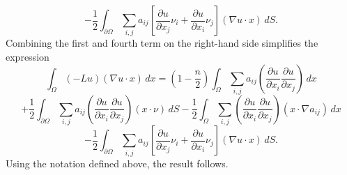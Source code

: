 $$- \frac{1}{2} \int_{\partial\Omega}
\sum_{i,j} a_{ij} \left[
\frac{\partial u}{\partial x_j} \nu_{i} +
\frac{\partial u}{\partial x_i} \nu_{j}
\right] (\nabla u\cdot x) \, dS.
$$
Combining the first and fourth term on the right-hand side
simplifies the expression
$$\int_{\Omega}(-Lu)(\nabla u\cdot x)\, dx
=
(1-\frac{n}{2}) \int_{\Omega}
\sum_{i,j} a_{ij} \left(
\frac{\partial u}{\partial x_i}
\frac{\partial u}{\partial x_j}
\right) \, dx
$$
$$
+
\frac{1}{2} \int_{\partial\Omega}
\sum_{i,j} a_{ij} \left(
\frac{\partial u}{\partial x_i}
\frac{\partial u}{\partial x_j}
\right) (x\cdot \nu ) \, dS
-
\frac{1}{2} \int_{\Omega}
\sum_{i,j} \left(
\frac{\partial u}{\partial x_i}
\frac{\partial u}{\partial x_j}
\right) (x\cdot  \nabla a_{ij}) \, dx
$$
$$
-
\frac{1}{2} \int_{\partial\Omega}
\sum_{i,j} a_{ij} \left[
\frac{\partial u}{\partial x_j} \nu_{i} +
\frac{\partial u}{\partial x_i} \nu_{j}
\right] (\nabla u\cdot x) \, dS.
$$
Using the notation defined above, the result follows.


